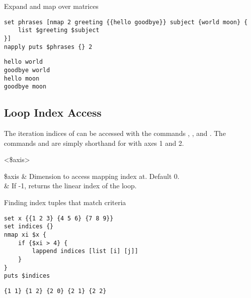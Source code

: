 \begin{example}{Expand and map over matrices}
\begin{lstlisting}
set phrases [nmap 2 greeting {{hello goodbye}} subject {world moon} {
    list $greeting $subject
}]
napply puts $phrases {} 2 
\end{lstlisting}
\tcblower
\begin{lstlisting}
hello world
goodbye world
hello moon
goodbye moon
\end{lstlisting}
\end{example}
\clearpage
\subsection{Loop Index Access}
The iteration indices of  can be accessed with the commands , , and . 
The commands  and  are simply shorthand for  with axes 1 and 2.
\begin{syntax}
 <\$axis>
\end{syntax}
\begin{syntax}
\end{syntax}
\begin{syntax}
\end{syntax}
\begin{args}	
\$axis & Dimension to access mapping index at. Default 0. \\
 & If -1, returns the linear index of the loop.
\end{args}

\begin{example}{Finding index tuples that match criteria}
\begin{lstlisting}
set x {{1 2 3} {4 5 6} {7 8 9}}
set indices {}
nmap xi $x {
    if {$xi > 4} {
        lappend indices [list [i] [j]]
    }
}
puts $indices
\end{lstlisting}
\tcblower
\begin{lstlisting}
{1 1} {1 2} {2 0} {2 1} {2 2}
\end{lstlisting}
\end{example}
\clearpage

